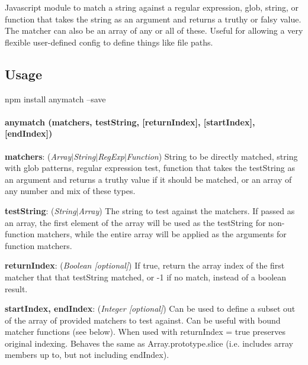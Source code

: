 Javascript module to match a string against a regular expression, glob, string, or function that takes the string as an argument and returns a truthy or falsy value. The matcher can also be an array of any or all of these. Useful for allowing a very flexible user-\/defined config to define things like file paths.

\href{https://nodei.co/npm/anymatch/}{\tt } \href{https://nodei.co/npm-dl/anymatch/}{\tt }

\subsection*{Usage }


\begin{DoxyCode}
npm install anymatch --save
\end{DoxyCode}


\paragraph*{anymatch (matchers, test\+String, \mbox{[}return\+Index\mbox{]}, \mbox{[}start\+Index\mbox{]}, \mbox{[}end\+Index\mbox{]})}


\begin{DoxyItemize}
\item {\bfseries matchers}\+: ({\itshape Array$\vert$\+String$\vert$\+Reg\+Exp$\vert$\+Function}) String to be directly matched, string with glob patterns, regular expression test, function that takes the test\+String as an argument and returns a truthy value if it should be matched, or an array of any number and mix of these types.
\item {\bfseries test\+String}\+: ({\itshape String$\vert$\+Array}) The string to test against the matchers. If passed as an array, the first element of the array will be used as the {\ttfamily test\+String} for non-\/function matchers, while the entire array will be applied as the arguments for function matchers.
\item {\bfseries return\+Index}\+: ({\itshape Boolean \mbox{[}optional\mbox{]}}) If true, return the array index of the first matcher that that test\+String matched, or -\/1 if no match, instead of a boolean result.
\item {\bfseries start\+Index, end\+Index}\+: ({\itshape Integer \mbox{[}optional\mbox{]}}) Can be used to define a subset out of the array of provided matchers to test against. Can be useful with bound matcher functions (see below). When used with {\ttfamily return\+Index = true} preserves original indexing. Behaves the same as {\ttfamily Array.\+prototype.\+slice} (i.\+e. includes array members up to, but not including end\+Index).
\end{DoxyItemize}


